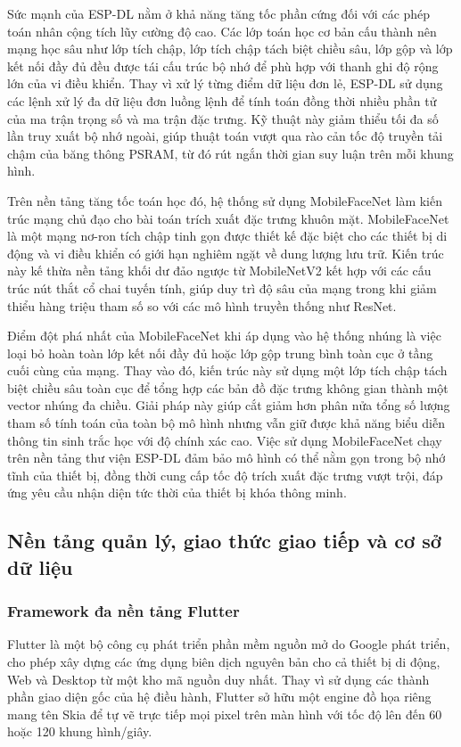 Sức mạnh của ESP-DL nằm ở khả năng tăng tốc phần cứng đối với các phép toán nhân cộng tích lũy cường độ cao. Các lớp toán học cơ bản cấu thành nên mạng học sâu như lớp tích chập, lớp tích chập tách biệt chiều sâu, lớp gộp và lớp kết nối đầy đủ đều được tái cấu trúc bộ nhớ để phù hợp với thanh ghi độ rộng lớn của vi điều khiển. Thay vì xử lý từng điểm dữ liệu đơn lẻ, ESP-DL sử dụng các lệnh xử lý đa dữ liệu đơn luồng lệnh để tính toán đồng thời nhiều phần tử của ma trận trọng số và ma trận đặc trưng. Kỹ thuật này giảm thiểu tối đa số lần truy xuất bộ nhớ ngoài, giúp thuật toán vượt qua rào cản tốc độ truyền tải chậm của băng thông PSRAM, từ đó rút ngắn thời gian suy luận trên mỗi khung hình.

Trên nền tảng tăng tốc toán học đó, hệ thống sử dụng MobileFaceNet làm kiến trúc mạng chủ đạo cho bài toán trích xuất đặc trưng khuôn mặt. MobileFaceNet là một mạng nơ-ron tích chập tinh gọn được thiết kế đặc biệt cho các thiết bị di động và vi điều khiển có giới hạn nghiêm ngặt về dung lượng lưu trữ. Kiến trúc này kế thừa nền tảng khối dư đảo ngược từ MobileNetV2 kết hợp với các cấu trúc nút thắt cổ chai tuyến tính, giúp duy trì độ sâu của mạng trong khi giảm thiểu hàng triệu tham số so với các mô hình truyền thống như ResNet.

Điểm đột phá nhất của MobileFaceNet khi áp dụng vào hệ thống nhúng là việc loại bỏ hoàn toàn lớp kết nối đầy đủ hoặc lớp gộp trung bình toàn cục ở tầng cuối cùng của mạng. Thay vào đó, kiến trúc này sử dụng một lớp tích chập tách biệt chiều sâu toàn cục để tổng hợp các bản đồ đặc trưng không gian thành một vector nhúng đa chiều. Giải pháp này giúp cắt giảm hơn phân nửa tổng số lượng tham số tính toán của toàn bộ mô hình nhưng vẫn giữ được khả năng biểu diễn thông tin sinh trắc học với độ chính xác cao. Việc sử dụng MobileFaceNet chạy trên nền tảng thư viện ESP-DL đảm bảo mô hình có thể nằm gọn trong bộ nhớ tĩnh của thiết bị, đồng thời cung cấp tốc độ trích xuất đặc trưng vượt trội, đáp ứng yêu cầu nhận diện tức thời của thiết bị khóa thông minh.

\subsection{Nền tảng quản lý, giao thức giao tiếp và cơ sở dữ liệu}

\subsubsection{Framework đa nền tảng Flutter}
Flutter là một bộ công cụ phát triển phần mềm nguồn mở do Google phát triển, cho phép xây dựng các ứng dụng biên dịch nguyên bản cho cả thiết bị di động, Web và Desktop từ một kho mã nguồn duy nhất. Thay vì sử dụng các thành phần giao diện gốc của hệ điều hành, Flutter sở hữu một engine đồ họa riêng mang tên Skia để tự vẽ trực tiếp mọi pixel trên màn hình với tốc độ lên đến 60 hoặc 120 khung hình/giây.

